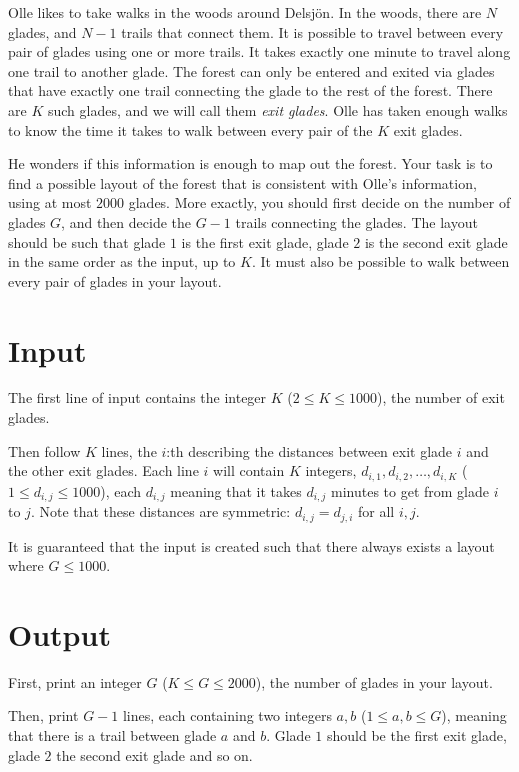 \noindent

Olle likes to take walks in the woods around Delsjön. In the woods, there are $N$ glades, and $N-1$
trails that connect them. It is possible to travel between every pair of glades using one or more trails.
It takes exactly one minute to travel along one trail to another glade. 
The forest can only be entered and exited via glades that have exactly one trail connecting the glade
to the rest of the forest. There are $K$ such glades, and we will call them \textit{exit glades}.
Olle has taken enough walks to know the time it takes to walk between every pair of the $K$ exit glades.

He wonders if this information is enough to map out the forest. Your task is to find a possible layout of the
forest that is consistent with Olle's information, using at most $2000$ glades. More exactly, you should first
decide on the number of glades $G$, and then decide the $G-1$ trails connecting the glades. The layout should
be such that glade $1$ is the first exit glade, glade $2$ is the second exit glade in the same order as the input, up to $K$.
It must also be possible to walk between every pair of glades in your layout.

\section*{Input}
The first line of input contains the integer $K$ ($2 \leq K \leq 1000$), the number of exit glades.

Then follow $K$ lines, the $i$:th describing the distances between exit glade $i$ and the other exit glades. Each line $i$ will contain
$K$ integers, $d_{i,1}, d_{i,2}, \dots, d_{i,K}$ ($1 \leq d_{i,j} \leq 1000$), each $d_{i,j}$ meaning that it takes $d_{i,j}$ 
minutes to get from glade $i$ to $j$. Note that these distances are symmetric: $d_{i,j}=d_{j,i}$ for all $i,j$.

It is guaranteed that the input is created such that there always exists a layout where $G \leq 1000$.

\section*{Output}
First, print an integer $G$ ($K \leq G \leq 2000$), the number of glades in your layout.

Then, print $G-1$ lines, each containing two integers $a,b$ ($1 \leq a,b \leq G$), meaning that there
is a trail between glade $a$ and $b$. Glade $1$ should be the first exit glade, glade $2$ the second
exit glade and so on.

